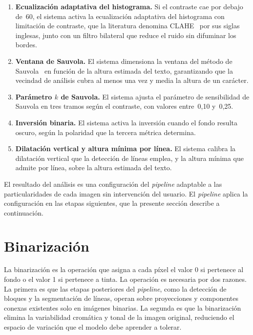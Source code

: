 \begin{enumerate}[leftmargin=*,labelsep=0.5em]
	\item \textbf{Ecualización adaptativa del histograma.} Si el contraste cae por debajo de~60, el sistema activa la ecualización adaptativa del histograma con limitación de contraste, que la literatura denomina CLAHE~\cite{zuiderveld1994clahe} por sus siglas inglesas, junto con un filtro bilateral que reduce el ruido sin difuminar los bordes.
	\item \textbf{Ventana de Sauvola.} El sistema dimensiona la ventana del método de Sauvola~\cite{sauvola2000binarization} en función de la altura estimada del texto, garantizando que la vecindad de análisis cubra al menos una vez y media la altura de un carácter.
	\item \textbf{Parámetro $k$ de Sauvola.} El sistema ajusta el parámetro de sensibilidad de Sauvola en tres tramos según el contraste, con valores entre~0,10 y~0,25.
	\item \textbf{Inversión binaria.} El sistema activa la inversión cuando el fondo resulta oscuro, según la polaridad que la tercera métrica determina.
	\item \textbf{Dilatación vertical y altura mínima por línea.} El sistema calibra la dilatación vertical que la detección de líneas emplea, y la altura mínima que admite por línea, sobre la altura estimada del texto.
\end{enumerate}

El resultado del análisis es una configuración del \textit{pipeline} adaptable a las particularidades de cada imagen sin intervención del usuario. El \textit{pipeline} aplica la configuración en las etapas siguientes, que la presente sección describe a continuación.

\section{Binarización}
\label{sec:binarizacion}

La binarización es la operación que asigna a cada píxel el valor 0 si pertenece al fondo o el valor 1 si pertenece a tinta. La operación es necesaria por dos razones. La primera es que las etapas posteriores del \textit{pipeline}, como la detección de bloques y la segmentación de líneas, operan sobre proyecciones y componentes conexas existentes solo en imágenes binarias. La segunda es que la binarización elimina la variabilidad cromática y tonal de la imagen original, reduciendo el espacio de variación que el modelo debe aprender a tolerar.

